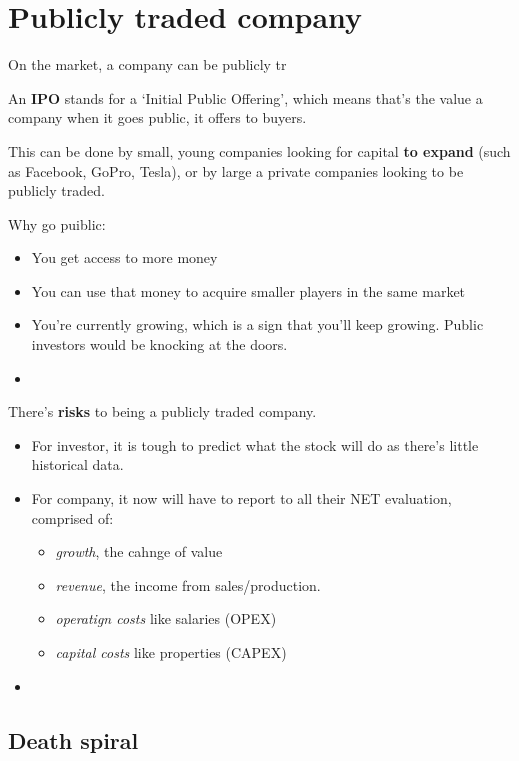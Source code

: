 
\section{Publicly traded company} \label{sec:publicly_traded_company}


On the market, a company can be publicly tr

An \textbf{IPO} stands for a `Initial Public Offering', which means that's the value a company when it goes public, it offers to buyers.

This can be done by small, young companies looking for capital \textbf{to expand} (such as Facebook, GoPro, Tesla), or by large a private companies looking to be publicly traded.

Why go puiblic:
\begin{itemize}
	\item You get access to more money
	\item You can use that money to acquire smaller players in the same market
	\item You're currently growing, which is a sign that you'll keep growing. Public investors would be knocking at the doors.
	\item 
\end{itemize}

There's \textbf{risks} to being a publicly traded company.
\begin{itemize}
	\item For investor, it is tough to predict what the stock will do as there's little historical data.
	\item For company, it now will have to report to all their NET evaluation, comprised of: 
	\begin{itemize}
		\item \textit{growth}, the cahnge of value
		\item \textit{revenue}, the income from sales/production.
		\item \textit{operatign costs} like salaries (OPEX)
		\item \textit{capital costs} like properties (CAPEX)
	\end{itemize}
	\item 
\end{itemize}

\subsection{Death spiral} 

